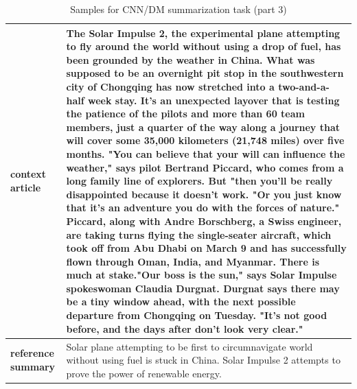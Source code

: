 \begin{table}[t]
\begin{center}
\caption*{Samples for CNN/DM summarization task (part 3)}
\begin{tabular}{|p{2cm}|p{12cm}|}

\hline
    
\hline
\textbf{context article}
&
\multicolumn{1}{|C{12cm}|}{ 
The Solar Impulse 2, the experimental plane attempting to fly around the world without using a drop of fuel, has been grounded by the weather in China.
\newline\newline
What was supposed to be an overnight pit stop in the southwestern city of Chongqing has now stretched into a two-and-a-half week stay.
\newline\newline
It's an unexpected layover that is testing the patience of the pilots and more than 60 team members, just a quarter of the way along a journey that will cover some 35,000 kilometers (21,748 miles) over five months.
\newline\newline
"You can believe that your will can influence the weather," says pilot Bertrand Piccard, who comes from a long family line of explorers.  But "then you'll be really disappointed because it doesn't work.
\newline\newline
"Or you just know that it's an adventure you do with the forces of nature."
\newline\newline
Piccard, along with Andre Borschberg, a Swiss engineer, are taking turns flying the single-seater aircraft, which took off from Abu Dhabi on March 9 and has successfully flown through Oman, India, and Myanmar.
\newline\newline
There is much at stake.\newline{}\newline\newline "Our boss is the sun," says Solar Impulse spokeswoman Claudia Durgnat.
\newline\newline
Durgnat says there may be a tiny window ahead, with the next possible departure from Chongqing on Tuesday. "It's not good before, and the days after don't look very clear."
}
\\
\hline
\textbf{reference summary}
&
Solar plane attempting to be first to circumnavigate world without using fuel is stuck in China. Solar Impulse 2 attempts to prove the power of renewable energy.\\
\hline
\hline


\end{tabular}
\end{center}
\end{table}
